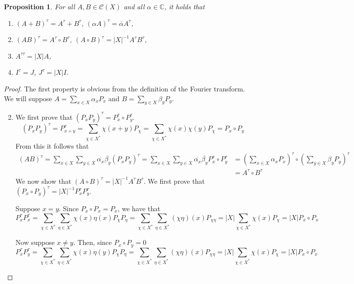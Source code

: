 \documentclass[a4paper,12pt]{article}
\theoremstyle{plain}
\newtheorem{proposition}[theorem]{Proposition}
\theoremstyle{definition}
\theoremstyle{remark}
\begin{document}
\begin{proposition}
    For all $ A,B \in \mathcal{C}(X) $ and all $ \alpha \in \mathbb{C} $, it holds
    that
    \begin{enumerate}[label=(\roman*)]
        \item $ (A + B)^{\tau} = A^{\tau} + B^{\tau} $,
            $ (\alpha A)^{\tau} = \overline{\alpha}A^{\tau} $,
        \item $ (AB)^{\tau} = A^{\tau} \circ B^{\tau} $,
            $ (A \circ B)^{\tau} = |X|^{-1} A^{\tau} B^{\tau} $,
        \item $ A^{\tau\tau} = |X|A $,
        \item $ I^{\tau} = J $, $ J^{\tau} = |X|I $.
    \end{enumerate}
    \label{prop:gamma_properties}
\end{proposition}
\begin{proof}
    The first property is obvious from the definition of the Fourier transform.
    We will suppose $ A = \sum_{ x \in X } \alpha_x P_x $ and
    $ B = \sum_{ y \in X } \beta_y P_y $.
    \begin{enumerate}[label=(\roman*)]
        \setcounter{enumi}{1}
        \item We first prove that $ (P_xP_y)^{\tau} = P_x^{\tau} \circ P_y^{\tau} $.
        \[ (P_xP_y)^{\tau} = P_{x+y}^{\tau} = \sum_{ \chi \in X^* }
            \chi(x+y) P_{\chi} = \sum_{ \chi \in X^* } \chi(x)\chi(y) P_{\chi}
            = P_x \circ P_y
        \]
        From this it follows that
        \[
            \begin{split}
            (AB)^{\tau} = \sum_{ x \in X } \sum_{ y \in X } \overline{\alpha_x}
            \overline{\beta_y} (P_xP_y)^{\tau} =
            \sum_{ x \in X } \sum_{ y \in X } \overline{\alpha_x}
            \overline{\beta_y} P_x^{\tau} \circ P_y^{\tau} &=
            \left ( \sum_{ x \in X } \alpha_x P_x \right )^{\tau} \circ
            \left ( \sum_{ y \in X } \beta_y P_y \right )^{\tau}  \\
                        &=A^{\tau} \circ B^{\tau}
            \end{split}
        \]
        We now show that $ (A \circ B)^{\tau} = |X|^{-1}A^{\tau}B^{\tau} $.
        We first prove that $ (P_x \circ P_y)^{\tau} = |X|^{-1}
        P_x^{\tau}P_y^{\tau} $.

        Suppose $ x=y $. Since $ P_x \circ P_x = P_x $, we have that
        \[
            P_x^{\tau} P_x^{\tau} = \sum_{ \chi \in X^* } \sum_{ \eta \in X^* }
            \chi(x) \eta(x) P_{\chi} P_{\eta} =
            \sum_{ \chi \in X^* } \sum_{ \eta \in X^* }
            (\chi\eta)(x) P_{\chi\eta} =
            |X| \sum_{ \chi \in X^* } \chi(x) P_{\chi} = |X| P_x \circ P_x
        \]

        Now suppose $ x \neq y $. Then, since $ P_x \circ P_y = 0 $
        \[
            P_x^{\tau} P_y^{\tau} = \sum_{ \chi \in X^* } \sum_{ \eta \in X^* }
            \chi(x) \eta(y) P_{\chi} P_{\eta} =
            \sum_{ \chi \in X^* } \sum_{ \eta \in X^* }
            (\chi\eta)(x) P_{\chi\eta} =
            |X| \sum_{ \chi \in X^* } \chi(x) P_{\chi} = |X| P_x \circ P_x
        \]
    \end{enumerate}
\end{proof}
\end{document}
